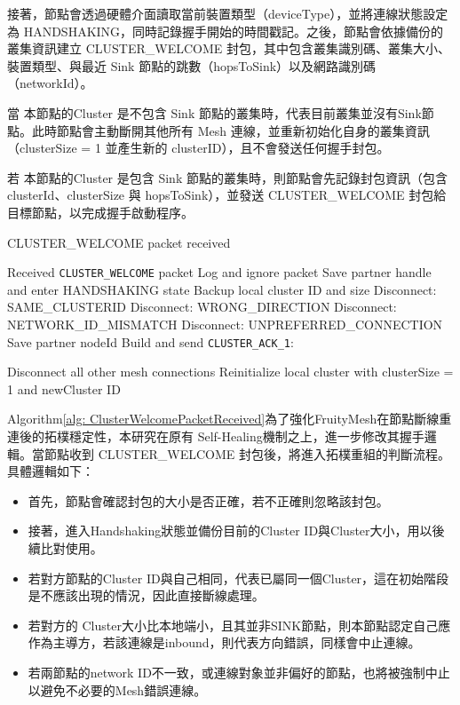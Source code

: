 \begin{ZhChapter}
接著，節點會透過硬體介面讀取當前裝置類型（deviceType），並將連線狀態設定為 HANDSHAKING，同時記錄握手開始的時間戳記。之後，節點會依據備份的叢集資訊建立 CLUSTER\_WELCOME 封包，其中包含叢集識別碼、叢集大小、裝置類型、與最近 Sink 節點的跳數（hopsToSink）以及網路識別碼（networkId）。

當 本節點的Cluster 是不包含 Sink 節點的叢集時，代表目前叢集並沒有Sink節點。此時節點會主動斷開其他所有 Mesh 連線，並重新初始化自身的叢集資訊（clusterSize = 1 並產生新的 clusterID），且不會發送任何握手封包。

若 本節點的Cluster 是包含 Sink 節點的叢集時，則節點會先記錄封包資訊（包含 clusterId、clusterSize 與 hopsToSink），並發送 CLUSTER\_WELCOME 封包給目標節點，以完成握手啟動程序。


\begin{algorithm}[H]
\caption{CLUSTER\_WELCOME packet received}
\label{alg: ClusterWelcomePacketReceived}
\begin{algorithmic}[1]
\Require Received \texttt{CLUSTER\_WELCOME} packet
    \State Log and ignore packet
\Else
    \State Save partner handle and enter HANDSHAKING state
    \State Backup local cluster ID and size
        \State Disconnect: SAME\_CLUSTERID
            \State Disconnect: WRONG\_DIRECTION
        \EndIf
        \State Disconnect: NETWORK\_ID\_MISMATCH
        \State Disconnect: UNPREFERRED\_CONNECTION
    \Else
        \State Save partner nodeId
        \State Build and send \texttt{CLUSTER\_ACK\_1}:

        \State Disconnect all other mesh connections
        \State Reinitialize local cluster with clusterSize = 1 and newCluster ID
    \EndIf
\EndIf
\end{algorithmic}
\end{algorithm}

Algorithm\ref{alg: ClusterWelcomePacketReceived}為了強化FruityMesh在節點斷線重連後的拓樸穩定性，本研究在原有 Self-Healing機制之上，進一步修改其握手邏輯。當節點收到 CLUSTER\_WELCOME 封包後，將進入拓樸重組的判斷流程。具體邏輯如下：

\begin{itemize}
    \item 首先，節點會確認封包的大小是否正確，若不正確則忽略該封包。
    \item 接著，進入Handshaking狀態並備份目前的Cluster ID與Cluster大小，用以後續比對使用。
    \item 若對方節點的Cluster ID與自己相同，代表已屬同一個Cluster，這在初始階段是不應該出現的情況，因此直接斷線處理。
    \item 若對方的 Cluster大小比本地端小，且其並非SINK節點，則本節點認定自己應作為主導方，若該連線是inbound，則代表方向錯誤，同樣會中止連線。
    \item 若兩節點的network ID不一致，或連線對象並非偏好的節點，也將被強制中止以避免不必要的Mesh錯誤連線。
\end{itemize}


\end{ZhChapter}
